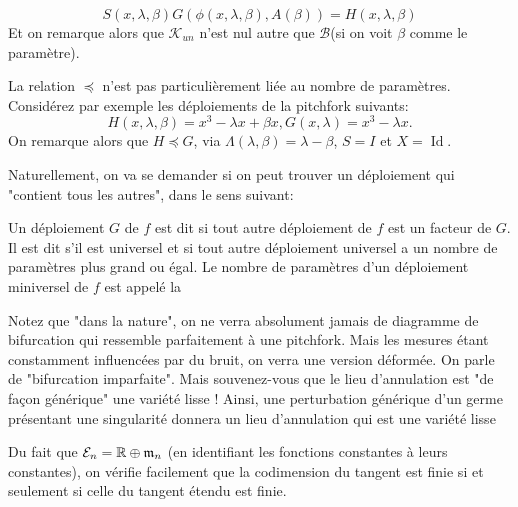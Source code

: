 \documentclass[memoire.tex]{subfiles}
\begin{document}
\begin{equation*}
    S(x,\lambda,\beta)G(\phi(x,\lambda,\beta),A(\beta))=H(x,\lambda,\beta)
\end{equation*}
Et on remarque alors que $\mathcal{K}_{un}$ n'est nul autre que $\mathcal{B}$(si on voit $\beta$ comme le paramètre).

\begin{exemple}
    La relation $\preccurlyeq$ n'est pas particulièrement liée au nombre de paramètres. Considérez par exemple les déploiements de la pitchfork suivants:
    \begin{equation*}
        H(x,\lambda,\beta)=x^3-\lambda x+\beta x, G(x,\lambda)=x^3-\lambda x.
    \end{equation*}
    On remarque alors que $H\preccurlyeq G$, via $\Lambda(\lambda,\beta)=\lambda-\beta$, $S=I$ et $X=\operatorname{Id}$.
\end{exemple}

Naturellement, on va se demander si on peut trouver un déploiement qui "contient tous les autres", dans le sens suivant:
\begin{definition}
    Un déploiement $G$ de $f$ est dit  si tout autre déploiement de $f$ est un facteur de $G$. Il est dit  s'il est universel et si tout autre déploiement universel a un nombre de paramètres plus grand ou égal. Le nombre de paramètres d'un déploiement miniversel de $f$ est appelé la 
\end{definition}


\begin{remarque}
    Notez que "dans la nature", on ne verra absolument jamais de diagramme de bifurcation qui ressemble parfaitement à une pitchfork. Mais les mesures étant constamment influencées par du bruit, on verra une version déformée. On parle de "bifurcation imparfaite". Mais souvenez-vous que le lieu d'annulation est "de façon générique" une variété lisse ! Ainsi, une perturbation générique d'un germe présentant une singularité donnera un lieu d'annulation qui est une variété lisse
\end{remarque}





Du fait que $\mathcal{E}_n=\mathbb{R}\oplus\mathfrak{m}_n$ 
(en identifiant les fonctions 
constantes à leurs 
constantes), on vérifie 
facilement que la 
codimension du tangent est finie si et seulement si celle du tangent étendu est finie.
\end{document}
